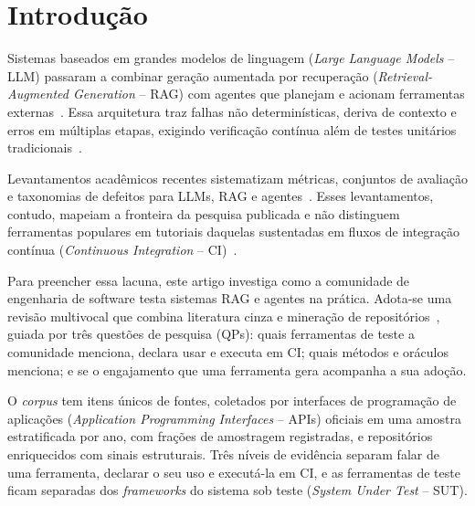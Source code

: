 \documentclass[sigconf]{acmart}
\begin{document}

\frenchspacing
\maketitle

\section{Introdução}
\label{sec:intro}

Sistemas baseados em grandes modelos de linguagem (\textit{Large Language Models} -- LLM) passaram a combinar geração aumentada por recuperação (\textit{Retrieval-Augmented Generation} -- RAG) com agentes que planejam e acionam ferramentas externas~\cite{lewis2020rag,gao2023ragsurvey,yehudai2025agents}. Essa arquitetura traz falhas não determinísticas, deriva de contexto e erros em múltiplas etapas, exigindo verificação contínua além de testes unitários tradicionais~\cite{zhang2022mltesting,barnett2024seven,cemri2025multiagent}.

Levantamentos acadêmicos recentes sistematizam métricas, conjuntos de avaliação e taxonomias de defeitos para LLMs, RAG e agentes~\cite{chang2024survey,yu2024ragsurvey,yehudai2025agents}. Esses levantamentos, contudo, mapeiam a fronteira da pesquisa publicada e não distinguem ferramentas populares em tutoriais daquelas sustentadas em fluxos de integração contínua (\textit{Continuous Integration} -- CI)~\cite{borges2018star,raulamo2017choosing}.

Para preencher essa lacuna, este artigo investiga como a comunidade de engenharia de software testa sistemas RAG e agentes na prática. Adota-se uma revisão multivocal que combina literatura cinza e mineração de repositórios~\cite{garousi2019guidelines,kalliamvakou2014promises}, guiada por três questões de pesquisa (QPs): quais ferramentas de teste a comunidade menciona, declara usar e executa em CI; quais métodos e oráculos menciona; e se o engajamento que uma ferramenta gera acompanha a sua adoção.

O \textit{corpus} tem \ResItens{} itens únicos de \ResFontes{} fontes, coletados por interfaces de programação de aplicações (\textit{Application Programming Interfaces} -- APIs) oficiais em uma amostra estratificada por ano, com frações de amostragem registradas, e \ResReposEnriquecidos{} repositórios enriquecidos com sinais estruturais. Três níveis de evidência separam falar de uma ferramenta, declarar o seu uso e executá-la em CI, e as ferramentas de teste ficam separadas dos \textit{frameworks} do sistema sob teste (\textit{System Under Test} -- SUT).
\end{document}
